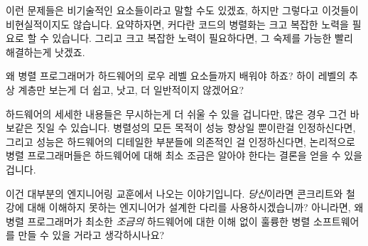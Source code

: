 \begin{enumerate}

	\end{enumerate}

	이런 문제들은 비기술적인 요소들이라고 말할 수도 있겠죠, 하지만 그렇다고
	이것들이 비현실적이지도 않습니다.
	요약하자면, 커다란 코드의 병렬화는 크고 복잡한 노력을 필요로 할 수
	있습니다.
	그리고 크고 복잡한 노력이 필요하다면, 그 숙제를 가능한 빨리 해결하는게
	낫겠죠.

\QuickQ{}
	왜 병렬 프로그래머가 하드웨어의 로우 레벨 요소들까지 배워야 하죠?
	하이 레벨의 추상 계층만 보는게 더 쉽고, 낫고, 더 일반적이지 않겠어요?

\QuickA{}
	하드웨어의 세세한 내용들은 무시하는게 더 쉬울 수 있을 겁니다만,
	많은 경우 그건 바보같은 짓일 수 있습니다.
	병렬성의 모든 목적이 성능 향상일 뿐이란걸 인정하신다면, 그리고 성능은
	하드웨어의 디테일한 부분들에 의존적인 걸 인정하신다면, 논리적으로 병렬
	프로그래머들은 하드웨어에 대해 최소 조금은 알아야 한다는 결론을 얻을 수
	있을 겁니다.

	이건 대부분의 엔지니어링 교훈에서 나오는 이야기입니다.
	\emph{당신}이라면 콘크리트와 철강에 대해 이해하지 못하는 엔지니어가
	설계한 다리를 사용하시겠습니까?
	아니라면, 왜 병렬 프로그래머가 최소한 \emph{조금의} 하드웨어에 대한
	이해 없이 훌륭한 병렬 소프트웨어를 만들 수 있을 거라고 생각하시나요?

